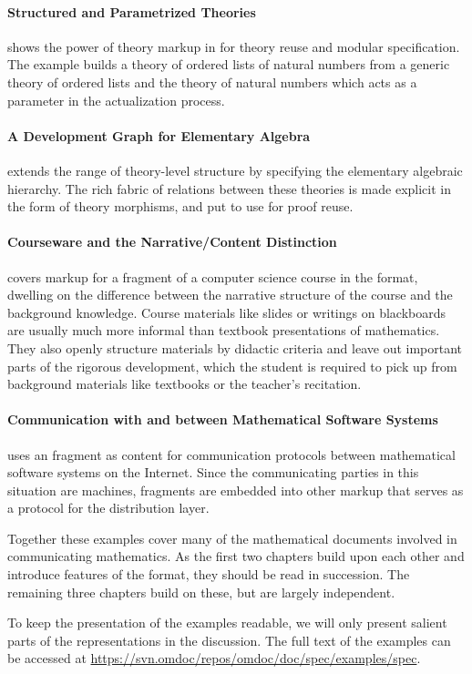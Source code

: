 \paragraph{ Structured and Parametrized Theories} shows the power of
theory markup in {\omdoc} for theory reuse and modular specification. The example builds a
theory of ordered lists of natural numbers from a generic theory of ordered lists and the
theory of natural numbers which acts as a parameter in the actualization process.

\paragraph{ A Development Graph for Elementary Algebra} extends the
range of theory-level structure by specifying the elementary algebraic hierarchy. The rich
fabric of relations between these theories is made explicit in the form of theory
morphisms, and put to use for proof reuse.

\paragraph{ Courseware and the Narrative/Content Distinction}
covers markup for a fragment of a computer science course in the {\omdoc} format, dwelling
on the difference between the narrative structure of the course and the background
knowledge. Course materials like slides or writings on blackboards are usually much more
informal than textbook presentations of mathematics. They also openly structure materials
by didactic criteria and leave out important parts of the rigorous development, which the
student is required to pick up from background materials like textbooks or the teacher's
recitation.

\paragraph{ Communication with and between Mathematical Software Systems}
uses an {\omdoc} fragment as content for communication protocols between mathematical
software systems on the Internet.  Since the communicating parties in this situation are
machines, {\omdoc} fragments are embedded into other {\xml} markup that serves as a
protocol for the distribution layer.

\medskip 

Together these examples cover many of the mathematical documents involved in communicating
mathematics. As the first two chapters build upon each other and introduce features of the
{\omdoc} format, they should be read in succession.  The remaining three chapters build on
these, but are largely independent.

To keep the presentation of the examples readable, we will only present salient parts of
the {\omdoc} representations in the discussion. The full text of the examples can be
accessed at \url{https://svn.omdoc/repos/omdoc/doc/spec/examples/spec}.


